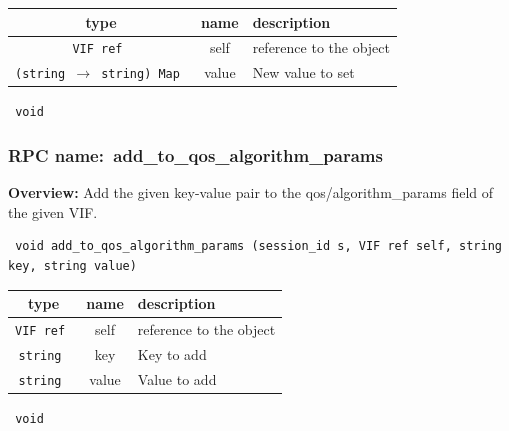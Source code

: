  
\vspace{0.3cm}
\begin{tabular}{|c|c|p{7cm}|}
 \hline
{\bf type} & {\bf name} & {\bf description} \\ \hline
{\tt VIF ref } & self & reference to the object \\ \hline 

{\tt (string $\rightarrow$ string) Map } & value & New value to set \\ \hline 

\end{tabular}

\vspace{0.3cm}

{\tt 
void
}



\vspace{0.3cm}
\vspace{0.3cm}
\vspace{0.3cm}
\subsubsection{RPC name:~add\_to\_qos\_algorithm\_params}

{\bf Overview:} 
Add the given key-value pair to the qos/algorithm\_params field of the
given VIF.

\begin{verbatim} void add_to_qos_algorithm_params (session_id s, VIF ref self, string key, string value)\end{verbatim}



 
\vspace{0.3cm}
\begin{tabular}{|c|c|p{7cm}|}
 \hline
{\bf type} & {\bf name} & {\bf description} \\ \hline
{\tt VIF ref } & self & reference to the object \\ \hline 

{\tt string } & key & Key to add \\ \hline 

{\tt string } & value & Value to add \\ \hline 

\end{tabular}

\vspace{0.3cm}

{\tt 
void
}



